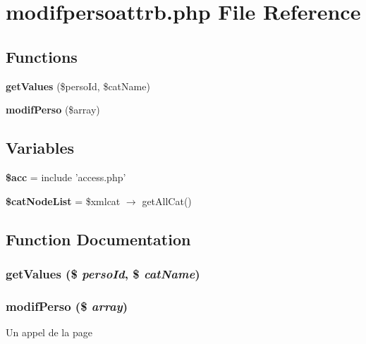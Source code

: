 \section{modifpersoattrb.php File Reference}
\label{modifpersoattrb_8php}


\subsection*{Functions}
\begin{CompactItemize}
\item 
{\bf get\-Values} (\$perso\-Id, \$cat\-Name)
\item 
{\bf modif\-Perso} (\$array)
\end{CompactItemize}
\subsection*{Variables}
\begin{CompactItemize}
\item 
{\bf \$acc} = include 'access.php'
\item 
{\bf \$cat\-Node\-List} = \$xmlcat $\rightarrow$ get\-All\-Cat()
\end{CompactItemize}


\subsection{Function Documentation}
\subsubsection{\setlength{\rightskip}{0pt plus 5cm}get\-Values (\$ {\em perso\-Id}, \$ {\em cat\-Name})}\label{modifpersoattrb_8php_0c0e540ac4dca0a1a0c812f94cf320d2}


\subsubsection{\setlength{\rightskip}{0pt plus 5cm}modif\-Perso (\$ {\em array})}\label{modifpersoattrb_8php_0f0208eddb78aae3115b211cd7728379}


Un appel de la page

